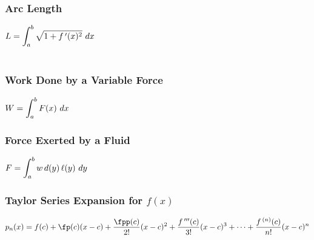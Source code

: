 \subsubsection*{Arc Length}

\noindent
$\ds L = \int_a^b{\sqrt{1+ f\,'(x)^2}}\ dx$\bigskip\\~


\noindent
\begin{minipage}[t]{.5\linewidth}
  \subsubsection*{Work Done by a Variable Force}
  $\displaystyle W = \int_a^b{F(x)}\ dx$
\end{minipage}%
\begin{minipage}[t]{.5\linewidth}
 \subsubsection*{Force Exerted by a Fluid}
 $\ds F = \int_a^b{w\,d(y)\,\ell(y)}\ dy$
\end{minipage}

\subsubsection*{Taylor Series Expansion for $f(x)$}
\noindent$\ds p_n(x) = f(c) + \fp(c)(x-c) + \frac{\fpp(c)}{2!}(x-c)^2 + \frac{f\,'''(c)}{3!}(x-c)^3 + \dotsb + \frac{f\,^{(n)}(c)}{n!}(x-c)^n$
\bigskip


